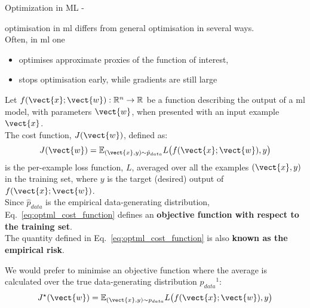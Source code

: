 
\begin{frame}[t,allowframebreaks]{
    Optimization in ML -}

    \Gls{optimisation} in \gls{ml}
    differs from general \gls{optimisation} in several ways.\\

    Often, in \gls{ml} one
    \begin{itemize}
        \item optimises approximate proxies of the function of interest, 
        \item stops optimisation early, while gradients are still large
    \end{itemize}

    \framebreak


    Let $f(\vect{x};\vect{w}): \mathbb{R}^n \rightarrow \mathbb{R}$
    be a function describing the output of a \gls{ml} model,
    with parameters $\vect{w}$, when presented with an input 
    example $\vect{x}$.\\
    \vspace{0.3cm}
    The \gls{cost function}, $J(\vect{w})$,
    defined as:
    \begin{equation}
        J(\vect{w}) = 
          \mathbb{E}_{(\vect{x},y){\sim}\hat{p}_{data}}
          L\big(f(\vect{x};\vect{w}),y\big)
        \label{eq:optml_cost_function}    
    \end{equation}
    is the per-example \gls{loss function},
    $L$, averaged over all the examples $(\vect{x},y)$ in the 
    \gls{training set},
    where $y$ is the target (desired) output of $f(\vect{x};\vect{w})$.\\
    \vspace{0.3cm}
    Since $\hat{p}_{data}$ is the 
    \gls{empirical data-generating distribution},
    Eq.~\ref{eq:optml_cost_function} defines an 
    {\bf {}\gls{objective function}
    with respect to the \gls{training set}}.\\
    \vspace{0.3cm}
    The quantity defined in Eq.~\ref{eq:optml_cost_function} is also 
    {\bf known as the \gls{empirical risk}}. 

    \framebreak


    We would prefer to minimise an \gls{objective function} where the
    average is calculated over the true
    \gls{data-generating distribution} $p_{data}$$^1$:
    \begin{equation}
        J^{\star}(\vect{w}) = 
          \mathbb{E}_{(\vect{x},y){\sim}p_{data}}
          L\big(f(\vect{x};\vect{w}),y\big)
        \label{eq:optml_risk}    
    \end{equation}


\end{frame}
